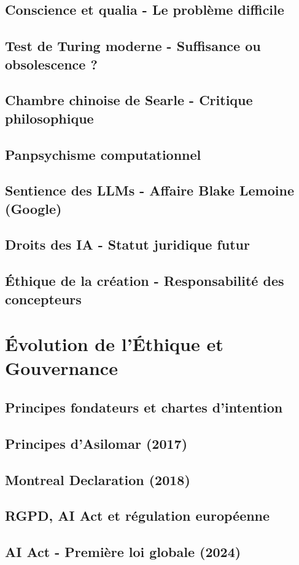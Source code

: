 \documentclass[12pt,a4paper]{book}
\begin{document}
\section{Conscience et qualia - Le problème difficile}
\section{Test de Turing moderne - Suffisance ou obsolescence ?}
\section{Chambre chinoise de Searle - Critique philosophique}
\section{Panpsychisme computationnel}
\section{Sentience des LLMs - Affaire Blake Lemoine (Google)}
\section{Droits des IA - Statut juridique futur}
\section{Éthique de la création - Responsabilité des concepteurs}

\chapter{Évolution de l'Éthique et Gouvernance}
\section{Principes fondateurs et chartes d'intention}
\section{Principes d'Asilomar (2017)}
\section{Montreal Declaration (2018)}
\section{RGPD, AI Act et régulation européenne}
\section{AI Act - Première loi globale (2024)}
\end{document}
